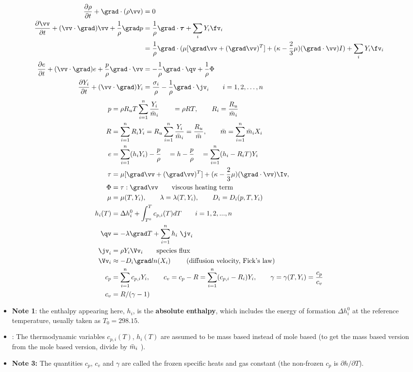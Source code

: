 \documentclass[10pt]{article}
\begin{document}
\begin{align}
   {\partial \rho  \over \partial t} + \grad\cdot(\rho \vv)&=0 \label{eq:continuity}\\
   {\partial \vv  \over \partial t}  + (\vv\cdot\grad)\vv +{1\over\rho} \grad p 
       &= {1\over\rho}\grad\cdot\tauv +\sum_i Y_i \fv_i\\
       & = {1\over\rho} \grad\cdot( \mu [\grad \vv +(\grad\vv)^T] +(\kappa-{2\over3}\mu) (\grad\cdot\vv)I)
          +\sum_i Y_i \fv_i\\
   {\partial e  \over \partial t}  + (\vv\cdot\grad)e + {p\over\rho}\grad\cdot\vv
           &= -{1\over\rho} \grad\cdot\qv  + {1\over\rho}\Phi    \\
  {\partial Y_i \over \partial t} + (\vv\cdot\grad) Y_i &= {\sigma_i \over \rho}
               -{1\over\rho}\grad\cdot\jv_i \qquad i=1,2,\ldots,n
\end{align}
\begin{align}
  p &= \rho R_u T \sumi {Y_i\over\mbar_i} \qquad = \rho R T ,\qquad R_i = {R_u\over \mbar_i}\\
  R & = \sumi R_i Y_i = R_u \sumi {Y_i\over\mbar_i} = {R_u \over \mbar}, \qquad \mbar=\sumi \mbar_i X_i   \\
  e &= \sumi( h_i Y_i) - {p\over\rho} \quad = h - {p\over\rho} \quad = \sumi( h_i - R_i T )Y_i \\
  \tau &= \mu[ \grad\vv + (\grad\vv)^T ] + (\kappa-{2\over3}\mu)(\grad\cdot\vv)\Iv , \\
     \Phi&=\tau : \grad\vv \qquad \mbox{viscous heating term} \\
  \mu &=\mu(T,Y_i), \qquad \lambda=\lambda(T,Y_i), \qquad D_i = D_i(p,T,Y_i) \\
  h_i(T) &= \Delta h_i^0 + \int_{T^0}^T c_{p,i}(T) dT \qquad i=1,2,...,n \\
  \qv &= - \lambda \grad T + \sumi h_i ~\jv_i  \quad  \\
  \jv_i & = \rho Y_i \Vv_i \qquad\mbox{species flux} \\
 \Vv_i &\approx -D_i \grad ln(X_i) \qquad\mbox{ (diffusion velocity, Fick's law)} \\
  c_p &= \sumi c_{p,i} Y_i , \qquad   c_v = c_p - R = \sumi (c_{p,i}-R_i) Y_i,\qquad   
        \gamma = \gamma(T,Y_i) = {c_p \over c_v} \\
  c_v &= R/(\gamma-1)
\end{align}
\begin{itemize}
\item {\bf Note 1}: the enthalpy appearing here, $h_i$, is the {\bf absolute enthalpy}, which includes 
  the energy of formation $ \Delta h_i^0$
  at the reference temperature, usually taken as $T_0=298.15$.
\item {}: The thermodynamic variables $c_{p,i}(T)$, $h_i(T)$ are assumed to be mass based instead
  of mole based (to get the mass based version from the mole based version, divide by $\bar{m}_i$ ).
\item {\bf Note 3:} The quantities $c_p$, $c_v$ and $\gamma$ are called the frozen specific heats and
     gas constant (the non-frozen $c_p$ is $\partial h /\partial T$).
\end{itemize}
\end{document}
